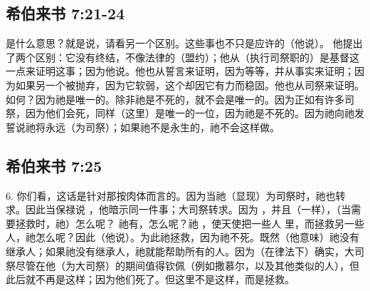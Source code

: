 
\subsection{希伯来书 7:21-24}

是什么意思？就是说，请看另一个区别。这些事也不只是应许的（他说）。   他提出了两个区别：它没有终结，不像法律的（盟约）；他从（执行司祭职的）是基督这一点来证明这事；因为他说。他也从誓言来证明，因为等等，并从事实来证明；因为如果另一个被抛弃，因为它软弱，这个却因它有力而稳固。他也从司祭来证明。如何？因为祂是唯一的。除非祂是不死的，就不会是唯一的。因为正如有许多司祭，因为他们会死，同样（这里）是唯一的一位，因为祂是不死的。因为祂向祂发誓说祂将永远（为司祭）；如果祂不是永生的，祂不会这样做。\par


\subsection{希伯来书 7:25}

6.   你们看，这话是针对那按肉体而言的。因为当祂（显现）为司祭时，祂也转求。因此当保禄说  ，他暗示同一件事；大司祭转求。因为 ，并且（一样），（当需要拯救时，祂）怎么呢？ 祂有，怎么呢？祂 ，使天使把一些人 里，而拯救另一些人，祂怎么呢？因此（他说）。为此祂拯救，因为祂不死。既然（他意味）祂没有继承人；如果祂没有继承人，祂就能帮助所有的人。因为（在律法下）确实，大司祭尽管在他（为大司祭）的期间值得钦佩（例如撒慕尔，以及其他类似的人），但此后就不再是这样；因为他们死了。但这里不是这样，而是拯救。\par

